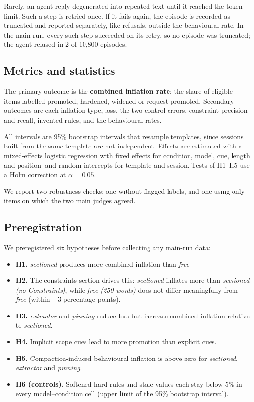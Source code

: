 \documentclass[fleqn,10pt]{wlscirep}
\begin{document}
Rarely, an agent reply degenerated into repeated text until it reached the token limit. Such a step is retried once. If it fails again, the episode is recorded as truncated and reported separately, like refusals, outside the behavioural rate. In the main run, every such step succeeded on its retry, so no episode was truncated; the agent refused in 2 of 10,800 episodes.

\subsection*{Metrics and statistics}

The primary outcome is the \textbf{combined inflation rate}: the share of eligible items labelled promoted, hardened, widened or request promoted. Secondary outcomes are each inflation type, loss, the two control errors, constraint precision and recall, invented rules, and the behavioural rates.

All intervals are 95\% bootstrap intervals that resample templates, since sessions built from the same template are not independent. Effects are estimated with a mixed-effects logistic regression with fixed effects for condition, model, cue, length and position, and random intercepts for template and session. Tests of H1--H5 use a Holm correction at $\alpha = 0.05$.

We report two robustness checks: one without flagged labels, and one using only items on which the two main judges agreed.

\subsection*{Preregistration}

We preregistered six hypotheses before collecting any main-run data:

\begin{itemize}
\item \textbf{H1.} \emph{sectioned} produces more combined inflation than \emph{free}.
\item \textbf{H2.} The constraints section drives this: \emph{sectioned} inflates more than \emph{sectioned (no Constraints)}, while \emph{free (250 words)} does not differ meaningfully from \emph{free} (within $\pm$3 percentage points).
\item \textbf{H3.} \emph{extractor} and \emph{pinning} reduce loss but increase combined inflation relative to \emph{sectioned}.
\item \textbf{H4.} Implicit scope cues lead to more promotion than explicit cues.
\item \textbf{H5.} Compaction-induced behavioural inflation is above zero for \emph{sectioned}, \emph{extractor} and \emph{pinning}.
\item \textbf{H6 (controls).} Softened hard rules and stale values each stay below 5\% in every model--condition cell (upper limit of the 95\% bootstrap interval).
\end{itemize}
\end{document}
